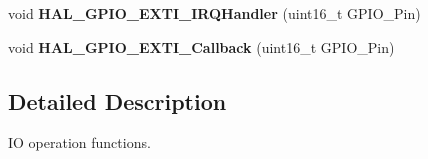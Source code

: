 \begin{DoxyCompactItemize}
\item 
\hypertarget{group___g_p_i_o___exported___functions___group2_gaa5de1ec4ebdd47e3e2b786224adaa9d0}{void {\bfseries H\-A\-L\-\_\-\-G\-P\-I\-O\-\_\-\-E\-X\-T\-I\-\_\-\-I\-R\-Q\-Handler} (uint16\-\_\-t G\-P\-I\-O\-\_\-\-Pin)}\label{group___g_p_i_o___exported___functions___group2_gaa5de1ec4ebdd47e3e2b786224adaa9d0}

\item 
\hypertarget{group___g_p_i_o___exported___functions___group2_ga0cd91fd3a9608559c2a87a8ba6cba55f}{void {\bfseries H\-A\-L\-\_\-\-G\-P\-I\-O\-\_\-\-E\-X\-T\-I\-\_\-\-Callback} (uint16\-\_\-t G\-P\-I\-O\-\_\-\-Pin)}\label{group___g_p_i_o___exported___functions___group2_ga0cd91fd3a9608559c2a87a8ba6cba55f}

\end{DoxyCompactItemize}


\subsection{Detailed Description}
I\-O operation functions. 